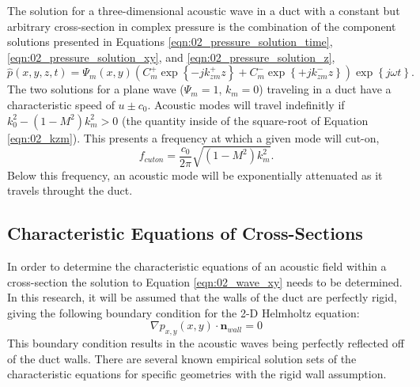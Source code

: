 The solution for a three-dimensional acoustic wave in a duct with a constant but arbitrary cross-section in complex pressure is the combination of the component solutions presented in Equations \ref{eqn:02_pressure_solution_time}, \ref{eqn:02_pressure_solution_xy}, and \ref{eqn:02_pressure_solution_z},
\begin{equation}
  \hat{p}(x,y,z,t) = \Psi_m(x,y)\left(C^+_m\exp{\left\{-jk^+_{zm}z\right\}}+C^-_m\exp{\left\{+jk^-_{zm}z\right\}}\right)\exp\left\{j\omega t\right\} \textrm{.}
  \label{eqn:02_pressure_solution_duct}
\end{equation}
The two solutions for a plane wave ($\Psi_m=1$, $k_m=0$) traveling in a duct have a characteristic speed of $u\pm c_0$.
Acoustic modes will travel indefinitly if $k_0^2-(1-M^2)k_m^2>0$ (the quantity inside of the square-root of Equation \ref{eqn:02_kzm}).
This presents a frequency at which a given mode will cut-on,
\begin{equation}
  f_{cuton} = \frac{c_0}{2\pi}\sqrt{(1-M^2)k_m^2} \textrm{.}
  \label{eqn:02_cuton_freq}
\end{equation}
Below this frequency, an acoustic mode will be exponentially attenuated as it travels throught the duct.

\subsection{Characteristic Equations of Cross-Sections}
In order to determine the characteristic equations of an acoustic field within a cross-section the solution to Equation \ref{eqn:02_wave_xy} needs to be determined.
In this research, it will be assumed that the walls of the duct are perfectly rigid, giving the following boundary condition for the 2-D Helmholtz equation:
\begin{equation}
  \nabla p_{x,y}(x,y)\cdot\mathbf{n}_{wall} = 0
  \label{eqn:02_bc_rigig_wall}
\end{equation}
This boundary condition results in the acoustic waves being perfectly reflected off of the duct walls.
There are several known empirical solution sets of the characteristic equations for specific geometries with the rigid wall assumption.

